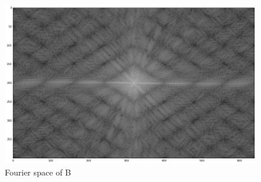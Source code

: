 \documentclass[a4paper,12px,twocolumn]{article}
\begin{document}
\begin{flushleft}
\begin{figure}[h!]
  \caption{Fourier space of  B}
  \includegraphics[scale=0.25]{B}
\end{figure}

\end{flushleft}
\end{document}

